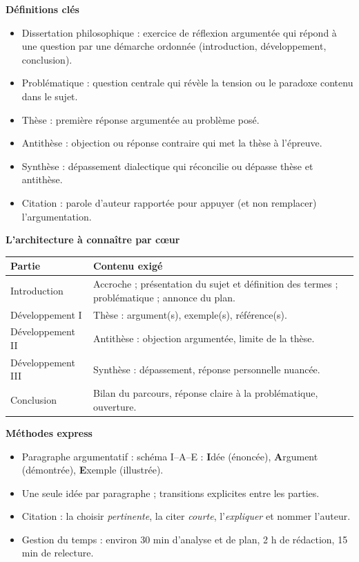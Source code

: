 \documentclass[11pt]{article}
\newcommand{\cle}[1]{{\popxbold\color{popdark}#1}}
\begin{document}
\begin{bilan}
\textbf{Définitions clés}
\begin{itemize}
  \item \cle{Dissertation philosophique} : exercice de réflexion argumentée qui répond à une question par une démarche ordonnée (introduction, développement, conclusion).
  \item \cle{Problématique} : question centrale qui révèle la tension ou le paradoxe contenu dans le sujet.
  \item \cle{Thèse} : première réponse argumentée au problème posé.
  \item \cle{Antithèse} : objection ou réponse contraire qui met la thèse à l'épreuve.
  \item \cle{Synthèse} : dépassement dialectique qui réconcilie ou dépasse thèse et antithèse.
  \item \cle{Citation} : parole d'auteur rapportée pour appuyer (et non remplacer) l'argumentation.
\end{itemize}

\textbf{L'architecture à connaître par cœur}
\begin{center}
\begin{tabularx}{\linewidth}{|l|X|}
\hline
\rowcolor{popblueL} \textbf{Partie} & \textbf{Contenu exigé} \\
\hline
Introduction & Accroche ; présentation du sujet et définition des termes ; problématique ; annonce du plan. \\
\hline
Développement I & Thèse : argument(s), exemple(s), référence(s). \\
\hline
Développement II & Antithèse : objection argumentée, limite de la thèse. \\
\hline
Développement III & Synthèse : dépassement, réponse personnelle nuancée. \\
\hline
Conclusion & Bilan du parcours, réponse claire à la problématique, ouverture. \\
\hline
\end{tabularx}
\end{center}

\textbf{Méthodes express}
\begin{itemize}
  \item Paragraphe argumentatif : schéma \cle{I--A--E} : \textbf{I}dée (énoncée), \textbf{A}rgument (démontrée), \textbf{E}xemple (illustrée).
  \item Une seule idée par paragraphe ; transitions explicites entre les parties.
  \item Citation : la choisir \emph{pertinente}, la citer \emph{courte}, l'\emph{expliquer} et nommer l'auteur.
  \item Gestion du temps : environ 30 min d'analyse et de plan, 2 h de rédaction, 15 min de relecture.
\end{itemize}
\end{bilan}
\end{document}

